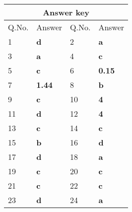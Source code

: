 \setlength\arrayrulewidth{1pt}
\begin{table}[H]
	\centering
	
	\begin{tabular}{|p{1.5cm}|p{1.5cm}||p{1.5cm}|p{1.5cm}|}
		\hline
		\multicolumn{4}{|c|}{\textbf{Answer key}}\\\hline\hline
		\rowcolor{ocrel}Q.No.&Answer&Q.No.&Answer\\\hline
		1&\textbf{d}&2&\textbf{a}\\\hline
		3&\textbf{a}&4&\textbf{c}\\\hline
		5&\textbf{c}&6&\textbf{0.15}\\\hline
		7&\textbf{1.44}&8&\textbf{b}\\\hline
		9&\textbf{c}&10&\textbf{4}\\\hline
		11&\textbf{d}&12&\textbf{4}\\\hline
		13&\textbf{c}&14&\textbf{c}\\\hline
		15&\textbf{b}&16&\textbf{d}\\\hline
		17&\textbf{d}&18&\textbf{a}\\\hline
		19&\textbf{c}&20&\textbf{c}\\\hline
		21&\textbf{c}&22&\textbf{c}\\\hline
		23&\textbf{d}&24&\textbf{a}\\\hline
	\end{tabular}
\end{table}


























































